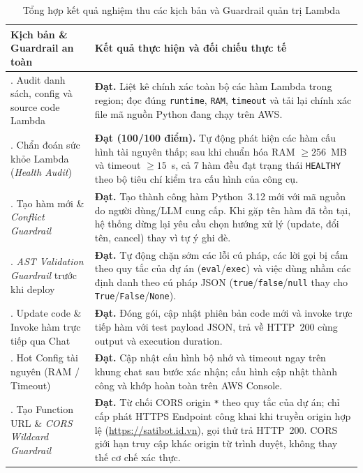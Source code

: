 \documentclass[a4paper,12pt]{article}
\newcommand{\code}[1]{\texttt{#1}}
\begin{document}
\begingroup
\setlength{\tabcolsep}{6pt}
\renewcommand{\arraystretch}{1.15}
\fontsize{10.5}{14}\selectfont
\begin{longtable}{@{}>{\raggedright\arraybackslash}p{5.1cm}>{\raggedright\arraybackslash}p{\dimexpr\linewidth-5.1cm-2\tabcolsep\relax}@{}}
\caption{Tổng hợp kết quả nghiệm thu các kịch bản và Guardrail quản trị Lambda}\label{tab:lambda_acceptance_summary}\\
\toprule
\textbf{Kịch bản \& Guardrail an toàn} & \textbf{Kết quả thực hiện và đối chiếu thực tế}\\
\midrule
\endfirsthead
\endhead
\endfoot
\bottomrule
\endlastfoot
1. Audit danh sách, config và source code Lambda & \textbf{Đạt.} Liệt kê chính xác toàn bộ các hàm Lambda trong region; đọc đúng \code{runtime}, \code{RAM}, \code{timeout} và tải lại chính xác file mã nguồn Python đang chạy trên AWS.\\
2. Chẩn đoán sức khỏe Lambda (\textit{Health Audit}) & \textbf{Đạt (100/100 điểm).} Tự động phát hiện các hàm cấu hình tài nguyên thấp; sau khi chuẩn hóa RAM $\ge 256$~MB và timeout $\ge 15$~s, cả 7 hàm đều đạt trạng thái \code{HEALTHY} theo bộ tiêu chí kiểm tra cấu hình của công cụ.\\
3. Tạo hàm mới \& \textit{Conflict Guardrail} & \textbf{Đạt.} Tạo thành công hàm Python~3.12 mới với mã nguồn do người dùng/LLM cung cấp. Khi gặp tên hàm đã tồn tại, hệ thống dừng lại yêu cầu chọn hướng xử lý (update, đổi tên, cancel) thay vì tự ý ghi đè.\\
4. \textit{AST Validation Guardrail} trước khi deploy & \textbf{Đạt.} Tự động chặn sớm các lỗi cú pháp, các lời gọi bị cấm theo quy tắc của dự án (\code{eval}/\code{exec}) và việc dùng nhầm các định danh theo cú pháp JSON (\code{true}/\code{false}/\code{null} thay cho \code{True}/\code{False}/\code{None}).\\
5. Update code \& Invoke hàm trực tiếp qua Chat & \textbf{Đạt.} Đóng gói, cập nhật phiên bản code mới và invoke trực tiếp hàm với test payload JSON, trả về HTTP~200 cùng output và execution duration.\\
6. Hot Config tài nguyên (RAM / Timeout) & \textbf{Đạt.} Cập nhật cấu hình bộ nhớ và timeout ngay trên khung chat sau bước xác nhận; cấu hình cập nhật thành công và khớp hoàn toàn trên AWS Console.\\
7. Tạo Function URL \& \textit{CORS Wildcard Guardrail} & \textbf{Đạt.} Từ chối CORS origin \code{*} theo quy tắc của dự án; chỉ cấp phát HTTPS Endpoint công khai khi truyền origin hợp lệ (\url{https://satibot.id.vn}), gọi thử trả HTTP~200. CORS giới hạn truy cập khác origin từ trình duyệt, không thay thế cơ chế xác thực.\\

\end{longtable}
\end{document}
